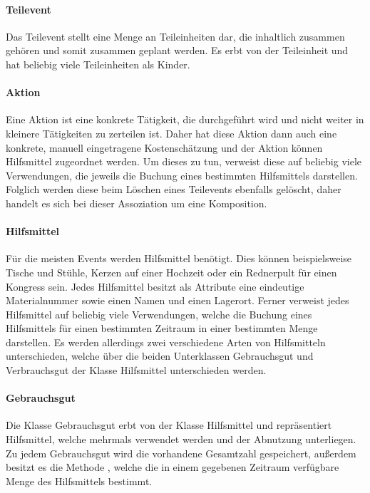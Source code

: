 \paragraph{Teilevent}
Das Teilevent stellt eine Menge an Teileinheiten dar, die inhaltlich zusammen gehören und somit zusammen geplant werden. Es erbt von der Teileinheit und hat beliebig viele Teileinheiten als Kinder.

\paragraph{Aktion}
Eine Aktion ist eine konkrete Tätigkeit, die durchgeführt wird und nicht weiter in kleinere Tätigkeiten zu zerteilen ist. Daher hat diese Aktion dann auch eine konkrete, manuell eingetragene Kostenschätzung und der Aktion können Hilfsmittel zugeordnet werden. Um dieses zu tun, verweist diese auf beliebig viele Verwendungen, die jeweils die Buchung eines bestimmten Hilfsmittels darstellen. Folglich werden diese beim Löschen eines Teilevents ebenfalls gelöscht, daher handelt es sich bei dieser Assoziation um eine Komposition.

\paragraph{Hilfsmittel}
Für die meisten Events werden Hilfsmittel benötigt. Dies können beispielsweise Tische und Stühle, Kerzen auf einer Hochzeit oder ein Rednerpult für einen Kongress sein. Jedes Hilfsmittel besitzt als Attribute eine eindeutige Materialnummer sowie einen Namen und einen Lagerort. Ferner verweist jedes Hilfsmittel auf beliebig viele Verwendungen, welche die Buchung eines Hilfsmittels für einen bestimmten Zeitraum in einer bestimmten Menge darstellen. Es werden allerdings zwei verschiedene Arten von Hilfsmitteln unterschieden, welche über die beiden Unterklassen Gebrauchsgut und Verbrauchsgut der Klasse Hilfsmittel unterschieden werden. 

\paragraph{Gebrauchsgut}
Die Klasse Gebrauchsgut erbt von der Klasse Hilfsmittel und repräsentiert Hilfsmittel, welche mehrmals verwendet werden und der Abnutzung unterliegen. Zu jedem Gebrauchsgut wird die vorhandene Gesamtzahl gespeichert, außerdem besitzt es die Methode , welche die in einem gegebenen Zeitraum verfügbare Menge des Hilfsmittels bestimmt.


